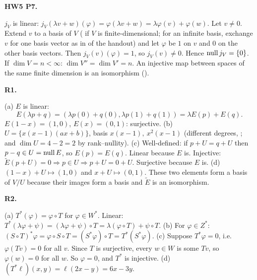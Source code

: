 \documentclass[10pt]{scrartcl}
\begin{document}
\begin{prob}\textbf{HW5 P7.}\par{}
\begin{steps}
  \ii $j_V$ is linear: $j_V(\lambda v+w)(\varphi)=\varphi(\lambda v+w)=\lambda\varphi(v)+\varphi(w)$.
  \ii Let $v\ne0$. Extend $v$ to a basis of $V$ ( if $V$ is finite-dimensional; for an infinite basis, exchange $v$ for one basis vector as in  of the handout) and let $\varphi$ be $1$ on $v$ and $0$ on the other basis vectors. Then $j_V(v)(\varphi)=1$, so $j_V(v)\ne0$. Hence $\operatorname{null} j_V=\{0\}$.
  \ii If $\dim V=n<\infty$: $\dim V''=\dim V'=n$. An injective map between spaces of the same finite dimension is an isomorphism ().
\end{steps}
\end{prob}

\begin{prob}\textbf{R1.}\par{}
\begin{steps}
  \ii (a) $E$ is linear:
  \[
    E(\lambda p+q)=(\lambda p(0)+q(0),\lambda p(1)+q(1))=\lambda E(p)+E(q).
  \] $E(1-x)=(1,0)$, $E(x)=(0,1)$: surjective.
  \ii (b) $U=\{x(x-1)(ax+b)\}$, basis $x(x-1),\ x^2(x-1)$ (different degrees, ; and $\dim U=4-2=2$ by rank--nullity).
  \ii (c) Well-defined: if $p+U=q+U$ then $p-q\in U=\operatorname{null} E$, so $E(p)=E(q)$. Linear because $E$ is. Injective: $\widetilde E(p+U)=0\Rightarrow p\in U\Rightarrow p+U=0+U$. Surjective because $E$ is.
  \ii (d) $(1-x)+U\mapsto(1,0)$ and $x+U\mapsto(0,1)$. These two elements form a basis of $V/U$ because their images form a basis and $\widetilde E$ is an isomorphism.
\end{steps}
\end{prob}

\begin{prob}\textbf{R2.}\par{}
\begin{steps}
  \ii (a) $T^*(\varphi)=\varphi\circ T$ for $\varphi\in W^*$. Linear: $T^*(\lambda\varphi+\psi)=(\lambda\varphi+\psi)\circ T=\lambda(\varphi\circ T)+\psi\circ T$.
  \ii (b) For $\varphi\in Z^*$: $(S\circ T)^*\varphi=\varphi\circ S\circ T=(S^*\varphi)\circ T=T^*(S^*\varphi)$.
  \ii (c) Suppose $T^*\varphi=0$, i.e.\ $\varphi(Tv)=0$ for all $v$. Since $T$ is surjective, every $w\in W$ is some $Tv$, so $\varphi(w)=0$ for all $w$. So $\varphi=0$, and $T^*$ is injective.
  \ii (d) $(T^*\ell)(x,y)=\ell(2x-y)=6x-3y$.
\end{steps}
\end{prob}
\end{document}
